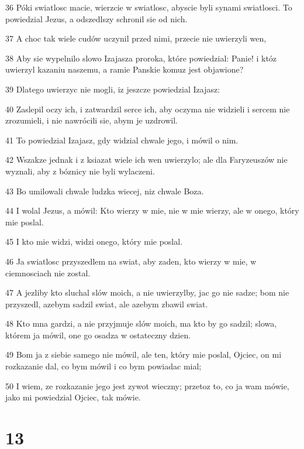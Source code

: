 \par 36 Póki swiatlosc macie, wierzcie w swiatlosc, abyscie byli synami swiatlosci. To powiedzial Jezus, a odszedlszy schronil sie od nich.
\par 37 A choc tak wiele cudów uczynil przed nimi, przecie nie uwierzyli wen,
\par 38 Aby sie wypelnilo slowo Izajasza proroka, które powiedzial: Panie! i któz uwierzyl kazaniu naszemu, a ramie Panskie komuz jest objawione?
\par 39 Dlatego uwierzyc nie mogli, iz jeszcze powiedzial Izajasz:
\par 40 Zaslepil oczy ich, i zatwardzil serce ich, aby oczyma nie widzieli i sercem nie zrozumieli, i nie nawrócili sie, abym je uzdrowil.
\par 41 To powiedzial Izajasz, gdy widzial chwale jego, i mówil o nim.
\par 42 Wszakze jednak i z ksiazat wiele ich wen uwierzylo; ale dla Faryzeuszów nie wyznali, aby z bóznicy nie byli wylaczeni.
\par 43 Bo umilowali chwale ludzka wiecej, niz chwale Boza.
\par 44 I wolal Jezus, a mówil: Kto wierzy w mie, nie w mie wierzy, ale w onego, który mie poslal.
\par 45 I kto mie widzi, widzi onego, który mie poslal.
\par 46 Ja swiatlosc przyszedlem na swiat, aby zaden, kto wierzy w mie, w ciemnosciach nie zostal.
\par 47 A jezliby kto sluchal slów moich, a nie uwierzylby, jac go nie sadze; bom nie przyszedl, azebym sadzil swiat, ale azebym zbawil swiat.
\par 48 Kto mna gardzi, a nie przyjmuje slów moich, ma kto by go sadzil; slowa, którem ja mówil, one go osadza w ostateczny dzien.
\par 49 Bom ja z siebie samego nie mówil, ale ten, który mie poslal, Ojciec, on mi rozkazanie dal, co bym mówil i co bym powiadac mial;
\par 50 I wiem, ze rozkazanie jego jest zywot wieczny; przetoz to, co ja wam mówie, jako mi powiedzial Ojciec, tak mówie.

\chapter{13}

